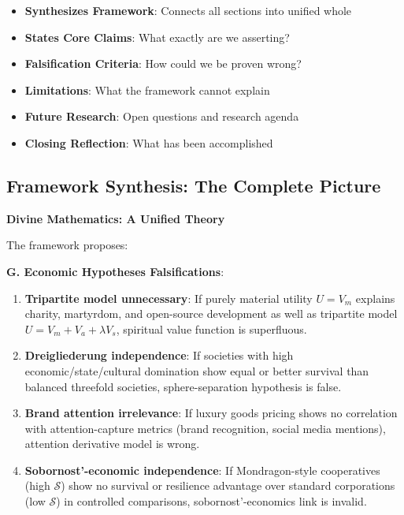 \documentclass[11pt,a4paper]{article}
\theoremstyle{definition}
\theoremstyle{remark}
\begin{document}
\begin{small}
\begin{enumerate}
\begin{mdframed}[backgroundcolor=cyan!5,linewidth=2pt]
\begin{itemize}[nosep]
    \item \textbf{Synthesizes Framework}: Connects all sections into unified whole
    \item \textbf{States Core Claims}: What exactly are we asserting?
    \item \textbf{Falsification Criteria}: How could we be proven wrong?
    \item \textbf{Limitations}: What the framework cannot explain
    \item \textbf{Future Research}: Open questions and research agenda
    \item \textbf{Closing Reflection}: What has been accomplished
\end{itemize}
\end{mdframed}

\subsection{Framework Synthesis: The Complete Picture}

\begin{mdframed}[backgroundcolor=blue!5,linewidth=2pt]
\textbf{Divine Mathematics: A Unified Theory}

The framework proposes:


\textbf{G. Economic Hypotheses Falsifications}:
\begin{enumerate}
    \item \textbf{Tripartite model unnecessary}: If purely material utility \(U = V_m\) explains charity, martyrdom, and open-source development as well as tripartite model \(U = V_m + V_a + \lambda V_s\), spiritual value function is superfluous.
    
    \item \textbf{Dreigliederung independence}: If societies with high economic/state/cultural domination show equal or better survival than balanced threefold societies, sphere-separation hypothesis is false.
    
    \item \textbf{Brand attention irrelevance}: If luxury goods pricing shows no correlation with attention-capture metrics (brand recognition, social media mentions), attention derivative model is wrong.
    
    \item \textbf{Sobornost'-economic independence}: If Mondragon-style cooperatives (high \(\mathcal{S}\)) show no survival or resilience advantage over standard corporations (low \(\mathcal{S}\)) in controlled comparisons, sobornost'-economics link is invalid.
    

\end{enumerate}
\end{mdframed}
\end{enumerate}
\end{small}
\end{document}
